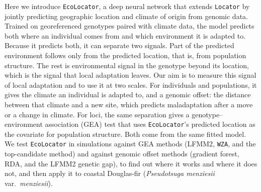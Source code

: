 \documentclass[]{article}
\newcommand{\dfir}{Douglas-fir\xspace}
\newcommand{\ecolocator}{\texttt{EcoLocator}\xspace}
\providecommand{\revpoint}[2]{}%
\begin{document}
Here we introduce \ecolocator,
a deep neural network that extends \texttt{Locator}
by jointly predicting geographic location and climate of origin from genomic data.
Trained on georeferenced genotypes paired with climate data,
the model predicts both where an individual comes from
and which environment it is adapted to.
Because it predicts both, it can separate two signals.
Part of the predicted environment follows only from the predicted location,
that is, from population structure.
The rest is environmental signal in the genotype beyond its location,
which is the signal that local adaptation leaves.
Our aim is to measure this signal of local adaptation
and to use it at two scales\revpoint{1}{1}.
For individuals and populations,
it gives the climate an individual is adapted to,
and a genomic offset:
the distance between that climate and a new site,
which predicts maladaptation after a move or a change in climate.
For loci, the same separation gives
a genotype--environment association (GEA) test
that uses \ecolocator's predicted location
as the covariate for population structure.
Both come from the same fitted model.
We test \ecolocator in simulations
against GEA methods (LFMM2, \texttt{WZA}, and the top-candidate method)
and against genomic offset methods
(gradient forest, RDA, and the LFMM2 genetic gap),
to find out where it works and where it does not,
and then apply it to coastal \dfir
(\textit{Pseudotsuga menziesii} var.\ \textit{menziesii}).
\end{document}
